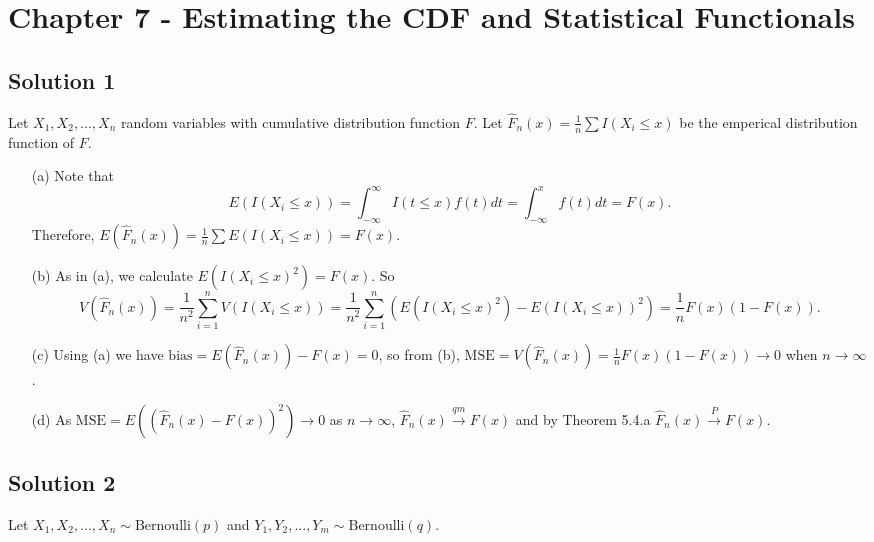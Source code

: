 \section*{Chapter 7 - Estimating the CDF and Statistical Functionals}

\subsection*{Solution 1}

Let $X_1, X_2, ..., X_n$ random variables with cumulative distribution function $F$.
Let $\hat{F}_n(x) = \frac{1}{n} \sum I(X_i \leq x)$ be the emperical distribution function of $F$.
\begin{itemize}
    \item[(a)] Note that
        \begin{equation*}
            E(I(X_i \leq x)) = \int_{-\infty}^{\infty} I(t \leq x) f(t) dt
                = \int_{-\infty}^{x} f(t) dt
                = F(x).
        \end{equation*}
        Therefore, $E(\hat{F}_n(x)) = \frac{1}{n} \sum E(I(X_i \leq x)) = F(x)$.
    \item[(b)] As in (a), we calculate $E(I(X_i \leq x)^2) = F(x)$.
        So
        \begin{equation*}
            V(\hat{F}_n(x)) = \frac{1}{n^2} \sum_{i = 1}^n V(I(X_i \leq x))
                = \frac{1}{n^2} \sum_{i = 1}^n (E(I(X_i \leq x)^2) - E(I(X_i \leq x))^2)
                = \frac{1}{n} F(x) (1 - F(x)).
        \end{equation*}
    \item[(c)] Using (a) we have $\mathrm{bias} = E(\hat{F}_n(x)) - F(x) = 0$, so from (b), $\mathrm{MSE} = V(\hat{F}_n(x)) = \frac{1}{n} F(x) (1 - F(x)) \to 0$ when $n \to \infty$.
    \item[(d)] As $\mathrm{MSE} = E((\hat{F}_n(x) - F(x))^2) \to 0$ as $n \to \infty$, $\hat{F}_n(x) \xrightarrow{qm} F(x)$ and by Theorem 5.4.a $\hat{F}_n(x) \xrightarrow{P} F(x)$.
\end{itemize}


\subsection*{Solution 2}

Let $X_1, X_2, ..., X_n \sim \mathrm{Bernoulli}(p)$ and $Y_1, Y_2, ..., Y_m \sim \mathrm{Bernoulli}(q)$.

